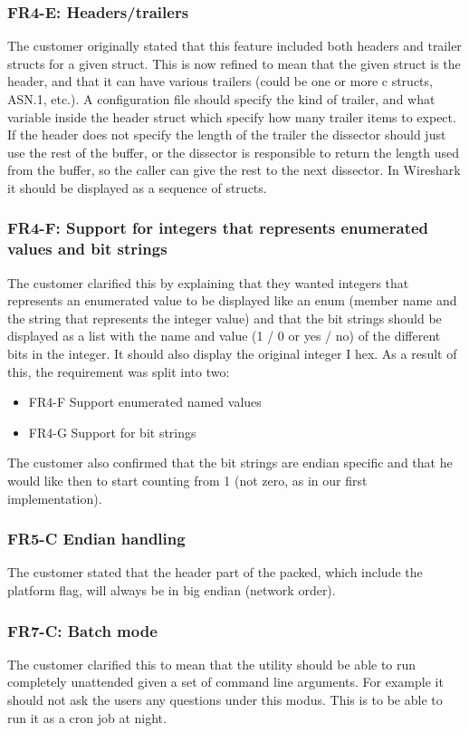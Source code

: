 \subsubsection{FR4-E: Headers/trailers}
The customer originally stated that this feature included both headers and trailer structs for a given struct. This is now refined to mean that the given struct is the header, and that it can have various trailers (could be one or more c structs, ASN.1, etc.). A configuration file should specify the kind of trailer, and what variable inside the header struct which specify how many trailer items to expect. If the header does not specify the length of the trailer the dissector should just use the rest of the buffer, or the dissector is responsible to return the length used from the buffer, so the caller can give the rest to the next dissector.
In Wireshark it should be displayed as a sequence of structs.

\subsubsection{FR4-F: Support for integers that represents enumerated values and bit strings}
The customer clarified this by explaining that they wanted integers that represents an enumerated value to be displayed like an enum (member name and the string that represents the integer value) and that the bit strings should be displayed as a list with the name and value (1 / 0 or yes / no) of the different bits in the integer. It should also display the original integer I hex. As a result of this, the requirement was split into two:
\begin{itemize}
\item FR4-F	Support enumerated named values
\item FR4-G	Support for bit strings
\end{itemize}
The customer also confirmed that the bit strings are endian specific and that he would like then to start counting from 1 (not zero, as in our first implementation).

\subsubsection{FR5-C Endian handling}
The customer stated that the header part of the packed, which include the platform flag, will always be in big endian (network order).

\subsubsection{FR7-C: Batch mode}
The customer clarified this to mean that the utility should be able to run completely unattended given a set of command line arguments. For example it should not ask the users any questions under this modus. This is to be able to run it as a cron job at night.

